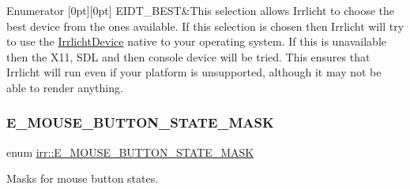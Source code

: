 \begin{DoxyEnumFields}{Enumerator}
[0pt][0pt]{}\mbox{\label{namespaceirr_ac25d94cf2e1037c7ca18ee79b3bd4505a133810710c44d1e9dc38fed7eeaba1cb}} 
E\+I\+D\+T\+\_\+\+B\+E\+ST&This selection allows Irrlicht to choose the best device from the ones available. If this selection is chosen then Irrlicht will try to use the \hyperlink{classirr_1_1IrrlichtDevice}{Irrlicht\+Device} native to your operating system. If this is unavailable then the X11, S\+DL and then console device will be tried. This ensures that Irrlicht will run even if your platform is unsupported, although it may not be able to render anything. \\
\hline

\end{DoxyEnumFields}
\mbox{\label{namespaceirr_a7057ec6fd3bba7cbbab3593c9e405a86}} 
\subsubsection{\texorpdfstring{E\+\_\+\+M\+O\+U\+S\+E\+\_\+\+B\+U\+T\+T\+O\+N\+\_\+\+S\+T\+A\+T\+E\+\_\+\+M\+A\+SK}{E\_MOUSE\_BUTTON\_STATE\_MASK}\hspace{0.1cm}{\footnotesize\ttfamily [1/2]}}
{\footnotesize\ttfamily enum \hyperlink{namespaceirr_a7057ec6fd3bba7cbbab3593c9e405a86}{irr\+::\+E\+\_\+\+M\+O\+U\+S\+E\+\_\+\+B\+U\+T\+T\+O\+N\+\_\+\+S\+T\+A\+T\+E\+\_\+\+M\+A\+SK}}



Masks for mouse button states. 

